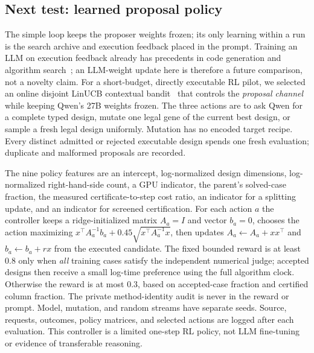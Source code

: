 \subsection{Next test: learned proposal policy}
The simple loop keeps the proposer weights frozen; its only learning within a
run is the search archive and execution feedback placed in the prompt. Training
an LLM on execution feedback already has precedents in code generation and
algorithm search~\citep{gehring2024rlef,surina2025evolutionrl}; an LLM-weight
update here is therefore a future comparison, not a novelty claim. For a
short-budget, directly executable RL pilot, we selected an online disjoint
LinUCB contextual bandit~\citep{li2010linucb} that controls the \emph{proposal
channel} while keeping Qwen's 27B weights frozen. The three actions are to ask
Qwen for a complete typed design, mutate one legal gene of the current best
design, or sample a fresh legal design uniformly. Mutation has no encoded
target recipe. Every distinct admitted or rejected executable design spends
one fresh evaluation; duplicate and malformed proposals are recorded.

The nine policy features are an intercept, log-normalized design dimensions,
log-normalized right-hand-side count, a GPU indicator, the parent's solved-case
fraction, the measured certificate-to-step cost ratio, an indicator for a
splitting update, and an indicator for screened certification. For each action
$a$ the controller keeps a ridge-initialized matrix $A_a=I$ and vector
$b_a=0$, chooses the action maximizing
$x^\top A_a^{-1}b_a+0.45\sqrt{x^\top A_a^{-1}x}$, then updates
$A_a\leftarrow A_a+xx^\top$ and $b_a\leftarrow b_a+r x$ from the executed
candidate. The fixed bounded reward is at least $0.8$ only when \emph{all}
training cases satisfy the independent numerical judge; accepted designs then
receive a small log-time preference using the full algorithm clock. Otherwise
the reward is at most $0.3$, based on accepted-case fraction and certified
column fraction. The private method-identity audit is never in the reward or
prompt. Model, mutation, and random streams have separate seeds. Source,
requests, outcomes, policy matrices, and selected actions are logged after each
evaluation. This controller is a limited one-step RL policy, not LLM
fine-tuning or evidence of transferable reasoning.

